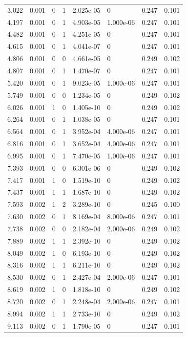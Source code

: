 \documentclass[preview]{standalone}
\begin{document}
{{\begin{tabular}{L{1.2cm}C{1.2cm} C{0.3cm}C{0.5cm} C{1.4cm}C{1.4cm} C{1.4cm}C{1.4cm}}
  3.022  &  0.001  & 0     &  1 &  2.025e-05  & 0  & 0.247 &  0.101   \\ 
  4.197  &  0.001  & 0     &  1 &  4.903e-05  & 1.000e-06  & 0.247 &  0.101   \\ 
  4.482  &  0.001  & 0     &  1 &  4.251e-05  & 0  & 0.247 &  0.101   \\ 
  4.615  &  0.001  & 0     &  1 &  4.041e-07  & 0  & 0.247 &  0.101   \\ 
  4.806  &  0.001  & 0     &  0 &  4.661e-05  & 0  & 0.249 &  0.102   \\ 
  4.807  &  0.001  & 0     &  1 &  1.470e-07  & 0  & 0.247 &  0.101   \\ 
  5.420  &  0.001  & 0     &  1 &  9.023e-05  & 1.000e-06  & 0.247 &  0.101   \\ 
  5.749  &  0.001  & 0     &  0 &  1.234e-05  & 0  & 0.249 &  0.102   \\ 
  6.026  &  0.001  & 1     &  0 &  1.405e-10  & 0  & 0.249 &  0.102   \\ 
  6.264  &  0.001  & 0     &  1 &  1.038e-05  & 0  & 0.247 &  0.101   \\ 
  6.564  &  0.001  & 0     &  1 &  3.952e-04  & 4.000e-06  & 0.247 &  0.101   \\ 
  6.816  &  0.001  & 0     &  1 &  3.652e-04  & 4.000e-06  & 0.247 &  0.101   \\ 
  6.995  &  0.001  & 0     &  1 &  7.470e-05  & 1.000e-06  & 0.247 &  0.101   \\ 
  7.393  &  0.001  & 0     &  0 &  6.301e-06  & 0  & 0.249 &  0.102   \\ 
  7.417  &  0.001  & 1     &  0 &  1.519e-10  & 0  & 0.249 &  0.102   \\ 
  7.437  &  0.001  & 1     &  1 &  1.687e-10  & 0  & 0.249 &  0.102   \\ 
  7.593  &  0.002  & 1     &  2 &  3.289e-10  & 0  & 0.245 &  0.100   \\ 
  7.630  &  0.002  & 0     &  1 &  8.169e-04  & 8.000e-06  & 0.247 &  0.101   \\ 
  7.738  &  0.002  & 0     &  0 &  2.182e-04  & 2.000e-06  & 0.249 &  0.102   \\ 
  7.889  &  0.002  & 1     &  1 &  2.392e-10  & 0  & 0.249 &  0.102   \\ 
  8.049  &  0.002  & 1     &  0 &  6.193e-10  & 0  & 0.249 &  0.102   \\ 
  8.316  &  0.002  & 1     &  1 &  6.211e-10  & 0  & 0.249 &  0.102   \\ 
  8.530  &  0.002  & 0     &  1 &  2.427e-04  & 2.000e-06  & 0.247 &  0.101   \\ 
  8.619  &  0.002  & 1     &  0 &  1.818e-10  & 0  & 0.249 &  0.102   \\ 
  8.720  &  0.002  & 0     &  1 &  2.248e-04  & 2.000e-06  & 0.247 &  0.101   \\ 
  8.994  &  0.002  & 1     &  1 &  2.733e-10  & 0  & 0.249 &  0.102   \\ 
  9.113  &  0.002  & 0     &  1 &  1.790e-05  & 0  & 0.247 &  0.101   \\ 
\hline 
\end{tabular} 

}}
\end{document}
